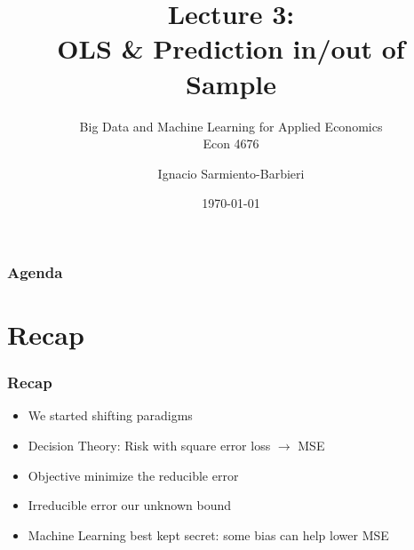 \documentclass[
  shownotes,
  xcolor={svgnames},
  hyperref={colorlinks,citecolor=DarkBlue,linkcolor=DarkRed,urlcolor=DarkBlue}
  ]{beamer}
\begin{document}
\title[Lecture 2]{Lecture 3: \\ OLS \& Prediction in/out of Sample}
\subtitle{Big Data and Machine Learning for Applied Economics \\ Econ 4676}
\date{\today}

\author[Sarmiento-Barbieri]{Ignacio Sarmiento-Barbieri}


\begin{frame}[noframenumbering]
\maketitle
\end{frame}





\begin{frame}
\frametitle{Agenda}

\tableofcontents


\end{frame}



\section{Recap}

\begin{frame}
\frametitle{Recap}

\begin{itemize} 
    \item We started shifting paradigms
    \bigskip
    \item Decision Theory: Risk with square error loss $\rightarrow$ MSE
    \bigskip
    \item Objective minimize the reducible error
    \bigskip
    \item Irreducible error our unknown bound
    \bigskip
    \item Machine Learning best kept secret:  some bias can help lower MSE
\end{itemize}
\end{frame}

\end{document}
